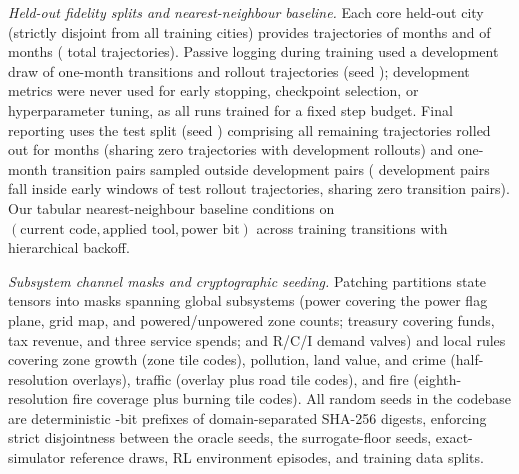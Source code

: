 \emph{Held-out fidelity splits and nearest-neighbour baseline.} Each core held-out city (strictly disjoint from all training cities) provides \PrHeldShortN{} trajectories of \PrHeldShortH{} months and \PrHeldLongN{} of \PrHeldLongH{} months (\PrHeldTraj{} total trajectories). Passive logging during training used a development draw of \PrDevTransitions{} one-month transitions and \PrDevPlans{} rollout trajectories (seed \PrDevSeed{}); development metrics were never used for early stopping, checkpoint selection, or hyperparameter tuning, as all runs trained for a fixed step budget. Final reporting uses the test split (seed \PrTestSeed{}) comprising all \TestPlans{} remaining trajectories rolled out for \Horizon{} months (sharing zero trajectories with development rollouts) and \TestTransitions{} one-month transition pairs sampled outside development pairs (\PrDevInWindows{} development pairs fall inside early windows of test rollout trajectories, sharing zero transition pairs). Our tabular nearest-neighbour baseline conditions on $(\text{current code}, \text{applied tool}, \text{power bit})$ across \PrNNFit{} training transitions with hierarchical backoff.

\emph{Subsystem channel masks and cryptographic seeding.} Patching partitions state tensors into \PrNSubsystems{} masks spanning \PrNGlobal{} global subsystems (power covering the power flag plane, grid map, and powered/unpowered zone counts; treasury covering funds, tax revenue, and three service spends; and R/C/I demand valves) and \PrNLocal{} local rules covering zone growth (zone tile codes), pollution, land value, and crime (half-resolution overlays), traffic (overlay plus road tile codes), and fire (eighth-resolution fire coverage plus burning tile codes). All random seeds in the codebase are deterministic \PrSeedBits-bit prefixes of domain-separated SHA-256 digests, enforcing strict disjointness between the \OracleSeeds{} oracle seeds, the \PrResidualSeeds{} surrogate-floor seeds, exact-simulator reference draws, RL environment episodes, and training data splits.
